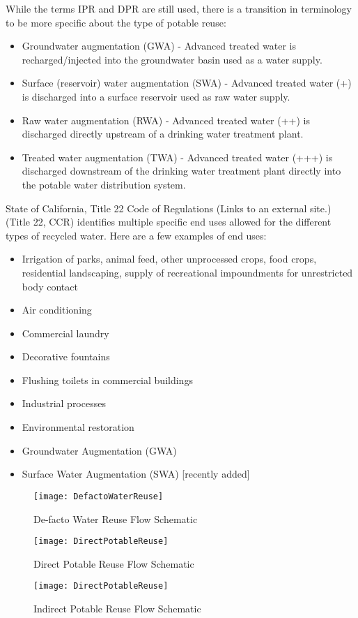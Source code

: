 \documentclass{article}
\begin{document}
While the terms IPR and DPR are still used, there is a transition in terminology to be more specific about the type of potable reuse:
\begin{itemize}
\item Groundwater augmentation (GWA) - Advanced treated water is recharged/injected into the groundwater basin used as a water supply.
\item Surface (reservoir) water augmentation (SWA) - Advanced treated water (+) is discharged into a surface reservoir used as raw water supply. 
\item Raw water augmentation (RWA) - Advanced treated water (++) is discharged directly upstream of a drinking water treatment plant.
\item Treated water augmentation (TWA) - Advanced treated water (+++) is discharged downstream of the drinking water treatment plant directly into the potable water distribution system.
\end{itemize}

State of California, Title 22 Code of Regulations (Links to an external site.) (Title 22, CCR) identifies multiple specific end uses allowed for the different types of recycled water.  Here are a few examples of end uses:
\begin{itemize}
\item Irrigation of parks, animal feed, other unprocessed crops, food crops, residential landscaping, supply of recreational impoundments for unrestricted body contact
\item Air conditioning
\item Commercial laundry
\item Decorative fountains
\item Flushing toilets in commercial buildings
\item Industrial processes
\item Environmental restoration
\item Groundwater Augmentation (GWA)
\item Surface Water Augmentation (SWA) [recently added]
\end{itemize}



\begin{figure}
\begin{center}
\texttt{[image: DefactoWaterReuse]}
\caption{De-facto Water Reuse Flow Schematic}
\end{center}
\end{figure}


\begin{figure}
\begin{center}
\texttt{[image: DirectPotableReuse]}
\caption{Direct Potable Reuse Flow Schematic}
\end{center}
\end{figure}

\begin{figure}
\begin{center}
\texttt{[image: DirectPotableReuse]}
\caption{Indirect Potable Reuse Flow Schematic}
\end{center}
\end{figure}
\end{document}
